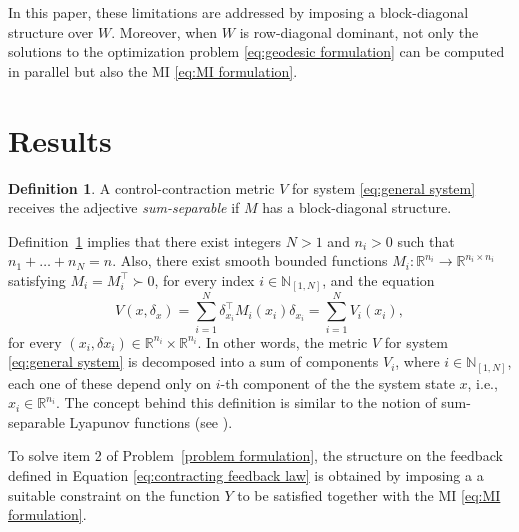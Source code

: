 \documentclass[10pt,twocolumn,twoside]{IEEEtran}
\theoremstyle{plain}
\theoremstyle{definition}
\newtheorem{definition}[theorem]{Definition}
\theoremstyle{remark}
\begin{document}
In this paper, these limitations are addressed by imposing a block-diagonal structure over $W$. Moreover, when $W$ is row-diagonal dominant, not only the solutions to the optimization problem \eqref{eq:geodesic formulation} can be computed in parallel but also the MI \eqref{eq:MI formulation}.

\section{Results}\label{sec:Results}

\begin{definition}\label{def:SSCCM}
	A control-contraction metric $V$ for system \eqref{eq:general system} receives the adjective \emph{sum-separable} if $M$ has a block-diagonal structure. 
\end{definition}

Definition~\ref{def:SSCCM} implies that there exist integers $N>1$ and $n_i>0$ such that $n_1+\ldots+n_N=n$. Also, there exist smooth bounded functions $M_i:\mathbb{R}^{n_i}\to\mathbb{R}^{n_i\times n_i}$ satisfying $M_i=M_i^\top\succ0$, for every index $i\in\mathbb{N}_{[1,N]}$, and the equation
	\begin{equation*}
		V(x,\delta_x)=\sum_{i=1}^N \delta_{x_i}^\top M_i(x_i)\delta_{x_i}=\sum_{i=1}^N V_i(x_i),
	\end{equation*}
for every $(x_i,\delta x_i)\in\mathbb{R}^{n_i}\times\mathbb{R}^{n_i}$. In other words, the metric $V$ for system \eqref{eq:general system} is decomposed into a sum of components $V_i$, where $i\in\mathbb{N}_{[1,N]}$, each one of these depend only on $i$-th component of the the system state $x$, i.e., $x_i\in\mathbb{R}^{n_i}$. The concept behind this definition is similar to the notion of sum-separable Lyapunov functions (see \cite{Dirr2015}). 

To solve item 2 of Problem~\ref{problem formulation}, the structure on the feedback defined in Equation \eqref{eq:contracting feedback law} is obtained by imposing a a suitable constraint on the function $Y$ to be satisfied together with the MI \eqref{eq:MI formulation}. 
\end{document}
